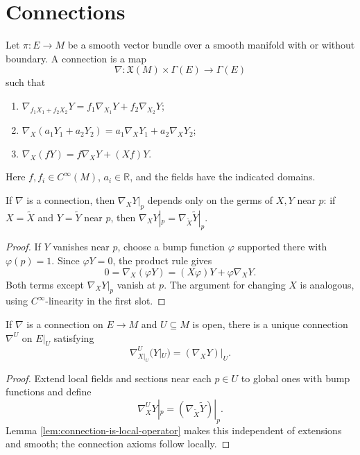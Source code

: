 \section{Connections}

\begin{definition}[Connection]
\label{def:connection}
\leanok
Let $\pi:E\to M$ be a smooth vector bundle over a smooth manifold with or without boundary. A connection is a map
\[
\nabla:\mathfrak X(M)\times\Gamma(E)\to\Gamma(E)
\]
such that
\begin{enumerate}
\item[(i)] $\nabla_{f_1X_1+f_2X_2}Y=f_1\nabla_{X_1}Y+f_2\nabla_{X_2}Y$;
\item[(ii)] $\nabla_X(a_1Y_1+a_2Y_2)=a_1\nabla_XY_1+a_2\nabla_XY_2$;
\item[(iii)] $\nabla_X(fY)=f\nabla_XY+(Xf)Y$.
\end{enumerate}
Here $f,f_i\in C^\infty(M)$, $a_i\in\mathbb R$, and the fields have the indicated domains.
\end{definition}

\begin{lemma}[Locality]
\label{lem:connection-is-local-operator}
\leanok
If $\nabla$ is a connection, then $\nabla_XY|_p$ depends only on the germs of $X,Y$ near $p$: if $X=\widetilde X$ and $Y=\widetilde Y$ near $p$, then $\nabla_XY|_p=\nabla_{\widetilde X}\widetilde Y|_p$.
\end{lemma}
\begin{proof}
\leanok
\sketch If $Y$ vanishes near $p$, choose a bump function $\varphi$ supported there with $\varphi(p)=1$. Since $\varphi Y=0$, the product rule gives
\begin{equation}
0=\nabla_X(\varphi Y)=(X\varphi)Y+\varphi\nabla_XY.\tag{4.5}
\end{equation}
Both terms except $\nabla_XY|_p$ vanish at $p$. The argument for changing $X$ is analogous, using $C^\infty$-linearity in the first slot.
\end{proof}

\begin{proposition}\label{prop:connection-restriction}
If $\nabla$ is a connection on $E\to M$ and $U\subseteq M$ is open, there is a unique connection $\nabla^U$ on $E|_U$ satisfying
\begin{equation}
\nabla^U_{X|_U}(Y|_U)=(\nabla_XY)|_U.\tag{4.6}
\end{equation}
\end{proposition}
\begin{proof}
\sketch Extend local fields and sections near each $p\in U$ to global ones with bump functions and define
\begin{equation}
\nabla^U_XY|_p=(\nabla_{\widetilde X}\widetilde Y)|_p.\tag{4.7}
\end{equation}
Lemma \ref{lem:connection-is-local-operator} makes this independent of extensions and smooth; the connection axioms follow locally.
\end{proof}

